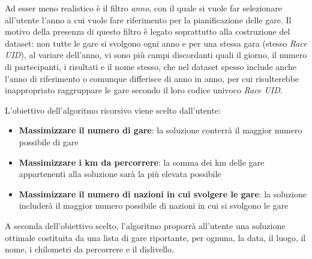 \documentclass[a4paper, 12pt, oneside]{book}
\begin{document}
Ad esser meno realistico è il filtro \textit{anno}, con il quale si vuole far selezionare all'utente l'anno a cui vuole fare riferimento per la pianificazione delle gare. Il motivo della presenza di questo filtro è legato soprattutto alla costruzione del dataset: non tutte le gare si svolgono ogni anno e per una stessa gara (stesso \textit{Race UID}), al variare dell'anno, vi sono più campi discordanti quali il giorno, il numero di partecipanti, i risultati e il nome stesso, che nel dataset spesso include anche l'anno di riferimento o comunque differisce di anno in anno, per cui risulterebbe inappropriato raggruppare le gare secondo il loro codice univoco \textit{Race UID}.

L'obiettivo dell'algoritmo ricorsivo viene scelto dall'utente: 
\begin{itemize}
    \item \textbf{Massimizzare il numero di gare}: la soluzione conterrà il maggior numero possibile di gare
    \item \textbf{Massimizzare i km da percorrere}: la somma dei km delle gare appartenenti alla soluzione sarà la più elevata possibile
    \item \textbf{Massimizzare il numero di nazioni in cui svolgere le gare}: la soluzione includerà il maggior numero possibile di nazioni in cui si svolgono le gare
\end{itemize}
A seconda dell'obiettivo scelto, l'algoritmo proporrà all'utente una soluzione ottimale costituita da una lista di gare riportante, per ognuna, la data, il luogo, il nome, i chilometri da percorrere e il dislivello.
\end{document}
